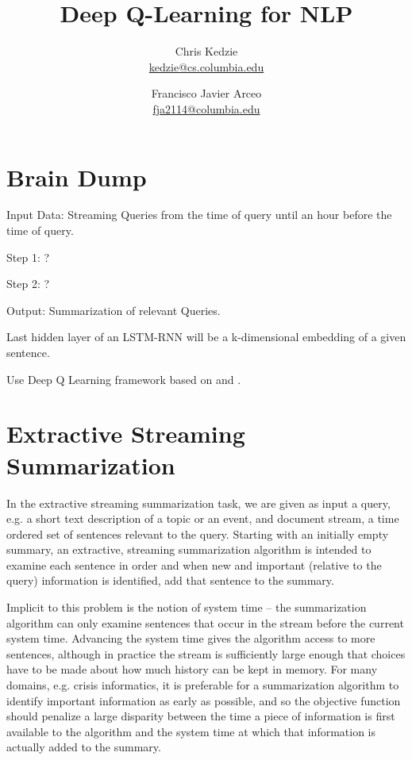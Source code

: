 \documentclass[12pt]{article}
\title{Deep Q-Learning for NLP}
\author{
	Chris Kedzie \\ \href{mailto: kedzie@cs.columbia.edu}{\small kedzie@cs.columbia.edu} 
		\and  
	Francisco Javier Arceo \\ \href{mailto: fja2114@columbia.edu}{\small fja2114@columbia.edu} 
	}
\begin{document}
\maketitle




\section{Brain Dump}

Input Data: Streaming Queries from the time of query until an hour before the time of query. 

Step 1:  ?

Step 2:  ?

Output: Summarization of relevant Queries.

Last hidden layer of an LSTM-RNN will be a k-dimensional embedding of a given sentence. 

Use Deep Q Learning framework based on \cite{MnihKSGAWR13} and \cite{DBLP:journals/corr/MnihBMGLHSK16}.


\section{Extractive Streaming Summarization}

  In the extractive streaming summarization task, we are given as input
  a query, e.g. a short text description of a topic or an event, and 
  document stream, a time ordered set of sentences 
  relevant to the query. Starting with an initially empty summary,  
  an extractive, streaming summarization algorithm is intended to 
  examine each sentence in order and when new and important (relative to the 
  query) information is identified, add that sentence to the summary. 

  Implicit to this problem is the notion of system time -- the 
  summarization algorithm can only examine sentences that occur in the stream
  before the current system time. Advancing the system time gives the algorithm
  access to more sentences, although in practice the stream is sufficiently 
  large enough that choices have to be made about how much history can be 
  kept in memory. For many domains, e.g. crisis informatics, it is preferable
  for a summarization algorithm to identify important information as early as 
  possible, and so the objective function should penalize a large disparity
  between the time a piece of information is first available to the algorithm
  and the system time at which that information is actually added to the 
  summary.
\end{document}
